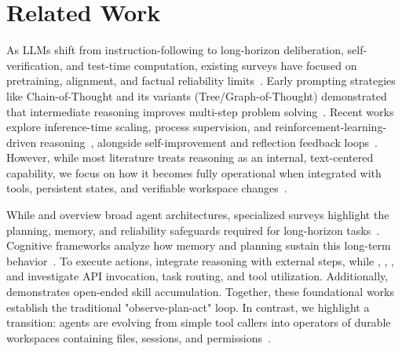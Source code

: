 \vspace{-2mm}\section{Related Work}\vspace{-1mm}

As LLMs shift from instruction-following to long-horizon deliberation, self-verification, and test-time computation, existing surveys have focused on pretraining, alignment, and factual reliability limits~\citep{QIN2025101118,zhao2023survey,huang2023hallucination,ji2023hallucination}. Early prompting strategies like Chain-of-Thought and its variants (Tree/Graph-of-Thought) demonstrated that intermediate reasoning improves multi-step problem solving~\citep{wei2022chain,kojima2022large,wang2022self,yao2023tree,besta2024graph}. Recent works explore inference-time scaling, process supervision, and reinforcement-learning-driven reasoning~\citep{chen2025towards,li2025system1system2,deepseek2025r1,snell2024scaling,muennighoff2025s1}, alongside self-improvement and reflection feedback loops~\citep{madaan2023selfrefine,shinn2023reflexion}. However, while most literature treats reasoning as an internal, text-centered capability, we focus on how it becomes fully operational when integrated with tools, persistent states, and verifiable workspace changes~\citep{jeong2024survey,chang2024survey,asante2026evaluation,masterman2024landscape,chen2025ai4researchsurveyartificialintelligence}.

While \citet{wang2024survey} and \citet{xi2023rise} overview broad agent architectures, specialized surveys highlight the planning, memory, and reliability safeguards required for long-horizon tasks~\citep{wei2025plangenllms,zhang2025survey,lin2025llm}. Cognitive frameworks analyze how memory and planning sustain this long-term behavior~\citep{sumers2023cognitive,park2023generative}. To execute actions, \citet{yao2022react} integrate reasoning with external steps, while \citet{schick2023toolformer}, \citet{qin2023toolllm}, \citet{shen2023hugginggpt}, and \citet{patil2023gorilla} investigate API invocation, task routing, and tool utilization. Additionally, \citet{wang2023voyager} demonstrates open-ended skill accumulation. Together, these foundational works establish the traditional "observe-plan-act" loop. In contrast, we highlight a transition: agents are evolving from simple tool callers into operators of durable workspaces containing files, sessions, and permissions~\citep{chowa2026language,chen2025tool,zhai2025survey}.

